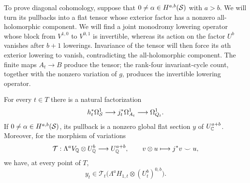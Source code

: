 To prove diagonal cohomology, suppose that
$0\ne\alpha\in H^{a,b}(\mathcal S)$ with $a>b$.  We will turn its
pullbacks into a flat tensor whose exterior factor has a nonzero
all-holomorphic component.  We will find a joint monodromy lowering
operator whose block from $V^{1,0}$ to $V^{0,1}$ is invertible,
whereas its action on the factor $U^b$ vanishes after $b+1$
lowerings.  Invariance of the tensor will
then force its $a$th exterior lowering to vanish, contradicting the
all-holomorphic component.  The finite maps $A_t\to B$ produce the
tensor; the rank-four invariant-cycle count, together with the
nonzero variation of $g$, produces the invertible lowering operator.

\begin{lemma}
\label{var:cup-image}
For every $t\in T$ there is a natural factorization
\begin{equation}
 h_t^*\Omega^1_{\mathcal S}\longrightarrow
 j_t^*\Omega^1_{A_t}\longrightarrow\Omega^1_{Q_t}.
 \label{var:factorization}
\end{equation}
If $0\ne\alpha\in H^{a,b}(\mathcal S)$, its pullback is a nonzero global
flat section $y$ of $U^{a+b}_\mathbb C$.  Moreover, for the morphism of
variations
\begin{equation}
 \mathcal T:\Lambda^a V_\mathbb Q\otimes U^b_\mathbb Q\longrightarrow U^{a+b}_\mathbb Q,
 \qquad v\otimes u\longmapsto j^*v\smile u,
 \label{var:cup-map}
\end{equation}
we have, at every point of $T$,
\begin{equation}
 y_t\in\mathcal T_t\bigl(
       \Lambda^a H_{1,t}\otimes (U^b_t)^{0,b}\bigr).
 \label{var:top-cup}
\end{equation}
\end{lemma}

